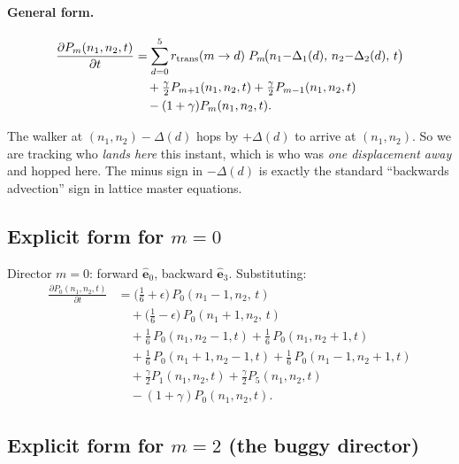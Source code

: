 \documentclass[11pt,a4paper]{article}
\newcommand{\nn}{\nonumber \\}
\newcommand{\veps}[1]{\hat{\mathbf{e}}_{#1}}
\begin{document}
\paragraph{General form.}
\begin{align}\label{eq:master_general}
\frac{\partial P_m(n_1, n_2, t)}{\partial t}
&= \sum_{d=0}^{5} r_{\rm trans}(m \to d)\; P_m\!\big(n_1{-}\Delta_1(d),\, n_2{-}\Delta_2(d),\, t\big) \nn
&\quad + \tfrac{\gamma}{2} P_{m+1}(n_1, n_2, t) + \tfrac{\gamma}{2} P_{m-1}(n_1, n_2, t) \nn
&\quad - (1 + \gamma) P_m(n_1, n_2, t).
\end{align}

\begin{intuition}
The walker at $(n_1, n_2) - \Delta(d)$ hops by $+\Delta(d)$ to arrive at
$(n_1, n_2)$. So we are tracking who \emph{lands here} this instant,
which is who was \emph{one displacement away} and hopped here. The
minus sign in $-\Delta(d)$ is exactly the standard ``backwards advection''
sign in lattice master equations.
\end{intuition}

\subsection{Explicit form for $m = 0$}\label{ssec:master-m0}

Director $m = 0$: forward $\veps{0}$, backward $\veps{3}$. Substituting:
\begin{align}\label{eq:master_m0}
\frac{\partial P_0(n_1, n_2, t)}{\partial t}
&= \big(\tfrac{1}{6} + \epsilon\big)\, P_0(n_1 - 1, n_2,\, t) \nn
&\quad + \big(\tfrac{1}{6} - \epsilon\big)\, P_0(n_1 + 1, n_2,\, t) \nn
&\quad + \tfrac{1}{6}\, P_0(n_1, n_2 - 1, t) + \tfrac{1}{6}\, P_0(n_1, n_2 + 1, t) \nn
&\quad + \tfrac{1}{6}\, P_0(n_1 + 1, n_2 - 1, t) + \tfrac{1}{6}\, P_0(n_1 - 1, n_2 + 1, t) \nn
&\quad + \tfrac{\gamma}{2} P_1(n_1, n_2, t) + \tfrac{\gamma}{2} P_5(n_1, n_2, t) \nn
&\quad - (1 + \gamma) P_0(n_1, n_2, t).
\end{align}

\subsection{Explicit form for $m = 2$ (the buggy director)}\label{ssec:master-m2}
\end{document}
